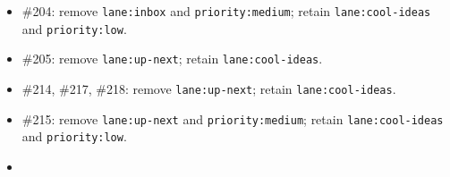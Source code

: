 \begin{itemize}
\tightlist
\item
  \#204: remove \texttt{l\allowbreak{}a\allowbreak{}n\allowbreak{}e\allowbreak{}:\allowbreak{}i\allowbreak{}n\allowbreak{}b\allowbreak{}o\allowbreak{}x} and \texttt{p\allowbreak{}r\allowbreak{}i\allowbreak{}o\allowbreak{}r\allowbreak{}i\allowbreak{}t\allowbreak{}y\allowbreak{}:\allowbreak{}m\allowbreak{}e\allowbreak{}d\allowbreak{}i\allowbreak{}u\allowbreak{}m}; retain \texttt{l\allowbreak{}a\allowbreak{}n\allowbreak{}e\allowbreak{}:\allowbreak{}c\allowbreak{}o\allowbreak{}o\allowbreak{}l\allowbreak{}-\allowbreak{}i\allowbreak{}d\allowbreak{}e\allowbreak{}a\allowbreak{}s} and \texttt{p\allowbreak{}r\allowbreak{}i\allowbreak{}o\allowbreak{}r\allowbreak{}i\allowbreak{}t\allowbreak{}y\allowbreak{}:\allowbreak{}l\allowbreak{}o\allowbreak{}w}.
\item
  \#205: remove \texttt{l\allowbreak{}a\allowbreak{}n\allowbreak{}e\allowbreak{}:\allowbreak{}u\allowbreak{}p\allowbreak{}-\allowbreak{}n\allowbreak{}e\allowbreak{}x\allowbreak{}t}; retain \texttt{l\allowbreak{}a\allowbreak{}n\allowbreak{}e\allowbreak{}:\allowbreak{}c\allowbreak{}o\allowbreak{}o\allowbreak{}l\allowbreak{}-\allowbreak{}i\allowbreak{}d\allowbreak{}e\allowbreak{}a\allowbreak{}s}.
\item
  \#214, \#217, \#218: remove \texttt{l\allowbreak{}a\allowbreak{}n\allowbreak{}e\allowbreak{}:\allowbreak{}u\allowbreak{}p\allowbreak{}-\allowbreak{}n\allowbreak{}e\allowbreak{}x\allowbreak{}t}; retain \texttt{l\allowbreak{}a\allowbreak{}n\allowbreak{}e\allowbreak{}:\allowbreak{}c\allowbreak{}o\allowbreak{}o\allowbreak{}l\allowbreak{}-\allowbreak{}i\allowbreak{}d\allowbreak{}e\allowbreak{}a\allowbreak{}s}.
\item
  \#215: remove \texttt{l\allowbreak{}a\allowbreak{}n\allowbreak{}e\allowbreak{}:\allowbreak{}u\allowbreak{}p\allowbreak{}-\allowbreak{}n\allowbreak{}e\allowbreak{}x\allowbreak{}t} and \texttt{p\allowbreak{}r\allowbreak{}i\allowbreak{}o\allowbreak{}r\allowbreak{}i\allowbreak{}t\allowbreak{}y\allowbreak{}:\allowbreak{}m\allowbreak{}e\allowbreak{}d\allowbreak{}i\allowbreak{}u\allowbreak{}m}; retain \texttt{l\allowbreak{}a\allowbreak{}n\allowbreak{}e\allowbreak{}:\allowbreak{}c\allowbreak{}o\allowbreak{}o\allowbreak{}l\allowbreak{}-\allowbreak{}i\allowbreak{}d\allowbreak{}e\allowbreak{}a\allowbreak{}s} and \texttt{p\allowbreak{}r\allowbreak{}i\allowbreak{}o\allowbreak{}r\allowbreak{}i\allowbreak{}t\allowbreak{}y\allowbreak{}:\allowbreak{}l\allowbreak{}o\allowbreak{}w}.
\item

\end{itemize}
